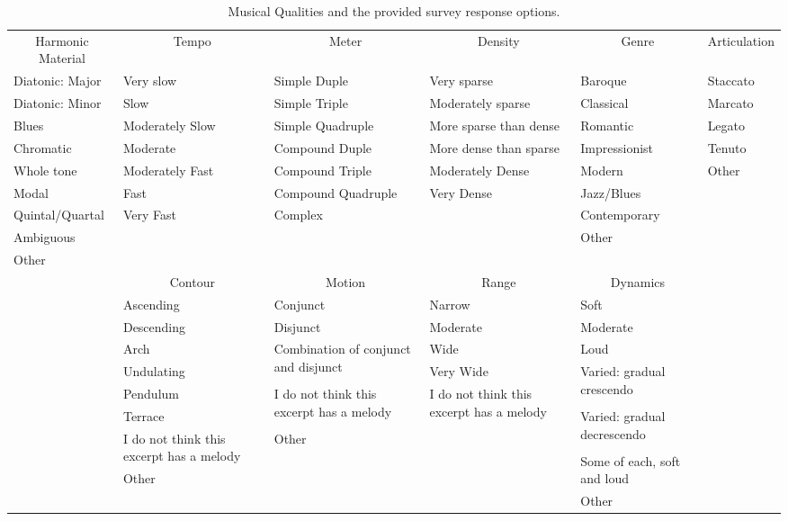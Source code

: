 \documentclass[
  english,
  man,floatsintext]{apa6}
\makeatletter
\newenvironment{lltable}{\begin{landscape}\begin{center}\begin{ThreePartTable}}{\end{ThreePartTable}\end{center}\end{landscape}}
\newcommand\LastLTentrywidth{1em}
\newlength\longtablewidth
\newcommand{\getlongtablewidth}{\begingroup \ifcsname LT@\roman{LT@tables}\endcsname \global\longtablewidth=0pt \renewcommand{\LT@entry}[2]{\global\advance\longtablewidth by ##2\relax\gdef\LastLTentrywidth{##2}}\@nameuse{LT@\roman{LT@tables}} \fi \endgroup}
\makeatother
\begin{document}
\begin{lltable}
\begin{scriptsize}
\begin{longtable}{p{}p{}p{}p{}p{}p{}}\noalign{\getlongtablewidth\global\LTcapwidth=\longtablewidth}
\caption{\label{tab:qualitiestable}Musical Qualities and the provided survey response options.}\\
\toprule[.8pt]
 \multicolumn{1}{c}{Harmonic Material} & \multicolumn{1}{c}{Tempo} & \multicolumn{1}{c}{Meter} & \multicolumn{1}{c}{Density} & \multicolumn{1}{c}{Genre} & \multicolumn{1}{c}{Articulation}\\
 \midrule
      Diatonic: Major & Very slow & Simple Duple & Very sparse & Baroque & Staccato \\
      Diatonic: Minor & Slow & Simple Triple & Moderately sparse & Classical & Marcato \\
      Blues & Moderately Slow & Simple Quadruple  & More sparse than dense & Romantic & Legato\\
      Chromatic & Moderate & Compound Duple & More dense than sparse & Impressionist & Tenuto\\
      Whole tone & Moderately Fast & Compound Triple & Moderately Dense & Modern & Other \\       
      Modal  & Fast & Compound Quadruple & Very Dense & Jazz/Blues & \\
      Quintal/Quartal  & Very Fast & Complex & & Contemporary & \\
      Ambiguous  & & & & Other & \\
      Other  & & & & & \\
\bottomrule\addlinespace[.5em]
 & \multicolumn{1}{c}{Contour} & \multicolumn{1}{c}{Motion} & \multicolumn{1}{c}{Range} & \multicolumn{1}{c}{Dynamics} & \\
 \cmidrule[.5pt]{2-5}
  & Ascending & Conjunct & Narrow & Soft & \\
  & Descending & Disjunct & Moderate & Moderate  & \\
  & Arch & \multirow{2}{0.2\textwidth}{Combination of conjunct and disjunct} & Wide & Loud  & \\
  & Undulating &  & Very Wide & \multirow{2}{0.2\textwidth}{Varied: gradual crescendo} &\\
  & Pendulum & \multirow{2}{0.2\textwidth}{I do not think this excerpt has a melody} & \multirow{2}{0.2\textwidth}{I do not think this excerpt has a melody} &  &\\
  & Terrace & & & \multirow{2}{0.2\textwidth}{Varied: gradual decrescendo} & \\
  & \multirow{2}{0.2\textwidth}{I do not think this excerpt has a melody} & Other & & &\\
  & & & & \multirow{2}{0.2\textwidth}{Some of each, soft and loud}   & \\
  & Other & & & & \\
  & & & & Other & \\
  
\cmidrule[.75pt]{2-5}
\end{longtable}
\end{scriptsize}
\end{lltable}
\end{document}
